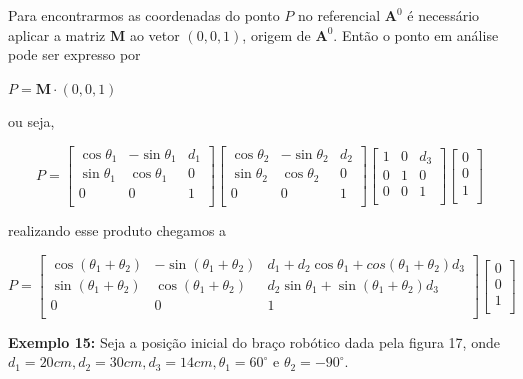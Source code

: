 Para encontrarmos as coordenadas do ponto $P$ no referencial $\mathbf{A}^0$ é necessário aplicar a matriz $\mathbf{M}$ ao vetor $(0, 0, 1)$, origem de $\mathbf{A}^0$. Então o ponto em análise pode ser expresso por

\centerline{$P = \mathbf{M}\cdot(0, 0, 1)$}

\noindent ou seja,

\[
P = \begin{bmatrix}
	\cos\theta_1 & -\sin\theta_1 & d_1\\
	\sin\theta_1 & \cos\theta_1 & 0\\
	0 & 0 & 1\\
\end{bmatrix}
\begin{bmatrix}
	\cos\theta_2 & -\sin\theta_2 & d_2\\
	\sin\theta_2 & \cos\theta_2 & 0\\
	0 & 0 & 1\\
\end{bmatrix}
\begin{bmatrix}
	1 & 0 & d_3\\
	0 & 1 & 0\\
	0 & 0 & 1\\
\end{bmatrix}
\begin{bmatrix}
	0\\
	0\\
	1\\
\end{bmatrix}
\]

\noindent realizando esse produto chegamos a 

\[
P = \begin{bmatrix}
	\cos(\theta_1 + \theta_2) & -\sin(\theta_1 + \theta_2) & d_1 + d_2\cos\theta_1 + cos(\theta_1 + \theta_2)d_3\\
	\sin(\theta_1 + \theta_2) & \cos(\theta_1 + \theta_2) & d_2\sin\theta_1 + \sin(\theta_1 + \theta_2)d_3\\
	0 & 0 & 1\\
\end{bmatrix}
\begin{bmatrix}
	0\\
	0\\
	1\\
\end{bmatrix}
\]

\noindent\textbf{Exemplo 15:} Seja a posição inicial do braço robótico dada pela figura 17, onde $d_1 = 20cm, d_2 = 30cm, d_3 = 14cm, \theta_1 = 60^{\circ}$ e $\theta_2 = -90^{\circ}$.

